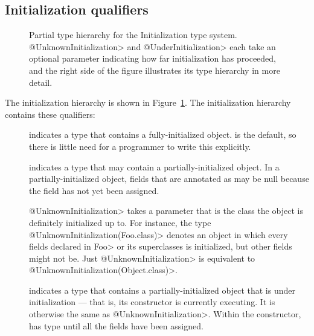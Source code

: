 \subsection{Initialization qualifiers\label{initialization-qualifiers}}

\begin{figure}
\caption{Partial type hierarchy for the Initialization type system.
  \<@UnknownInitialization> and \<@UnderInitialization> each take an
  optional parameter indicating how far initialization has proceeded, and
  the right side of the figure illustrates its type hierarchy in more detail.}
\label{fig-initialization-hierarchy}
\end{figure}

The initialization hierarchy is shown in Figure~\ref{fig-initialization-hierarchy}.
The initialization hierarchy contains these qualifiers:

\begin{description}

\item[]
  indicates a type that contains a fully-initialized object.  
  is the default, so there is little need for a programmer to write this
  explicitly.

\item[]
  indicates a type that may contain a partially-initialized object.  In a
  partially-initialized object, fields that are annotated as
   may be null because the field
  has not yet been assigned.

  \<@UnknownInitialization> takes a parameter that is the class the object
  is definitely initialized up to.  For instance, the type
  \<@UnknownInitialization(Foo.class)> denotes an object in which every
  fields declared in \<Foo> or its superclasses is initialized, but other
  fields might not be.
  Just \<@UnknownInitialization> is equivalent to
  \<@UnknownInitialization(Object.class)>.

\item[]
  indicates a type that contains a partially-initialized object that is
  under initialization --- that is, its constructor is currently executing.
  It is otherwise the same as \<@UnknownInitialization>.  Within the
  constructor,  has
   type until
  all the  fields have been assigned.

\end{description}

